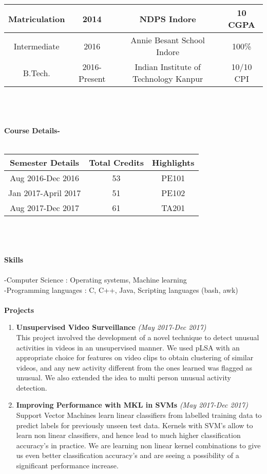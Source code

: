 \documentclass[a4paper, 11pt]{article}
\begin{document}
\begin{tabular}{ |c|c|c|c|} 
 \hline
 Matriculation & 2014 & NDPS Indore & 10 CGPA\\ \hline
 Intermediate & 2016 &Annie Besant School Indore &  100\%\\ 
 \hline
B.Tech. & 2016-Present & Indian Institute of Technology Kanpur &  10/10 CPI \\ 
 \hline
\end{tabular}\\~\\~\\
\textbf{Course Details-}\\~\\
\begin{tabular}{ |c|c|c|} 
 \hline
 \textbf{Semester Details} & \textbf{Total Credits} &  \textbf{Highlights}\\ \hline
 Aug 2016-Dec 2016 & 53 &  PE101\\ 
 \hline
Jan 2017-April 2017 & 51 & PE102\\ 
 \hline
  Aug 2017-Dec 2017 & 61 &  TA201\\ 
 \hline
\end{tabular}\\~\\~\\
\textbf{Skills}\\~\\
-Computer Science       : Operating systems, Machine learning\\
-Programming languages  : C, C++, Java, Scripting languages (bash, awk)\\~\\
\textbf{Projects}\\
\begin{enumerate}
\item \textbf{Unsupervised Video Surveillance} \hfill\textit{(May 2017-Dec 2017)}\\
This project involved the development of a novel technique to detect unusual activities in videos in an
unsupervised manner.  We used pLSA with an appropriate choice for features on video clips to obtain
clustering of similar videos, and any new activity different from the ones learned was flagged as unusual.
We also extended the idea to multi person unusual activity detection.
\item \textbf{Improving Performance with MKL in SVMs} \hfill\textit{(May 2017-Dec 2017)}\\
Support Vector Machines learn linear classifiers from labelled training data to predict labels for previously unseen test data.  Kernels with SVM’s allow to learn non linear classifiers, and hence lead to much
higher classification accuracy's in practice.  We are learning
non linear kernel combinations
to give
us even better classification accuracy's and are seeing a possibility of a significant performance increase.
\end{enumerate}
\end{document}
